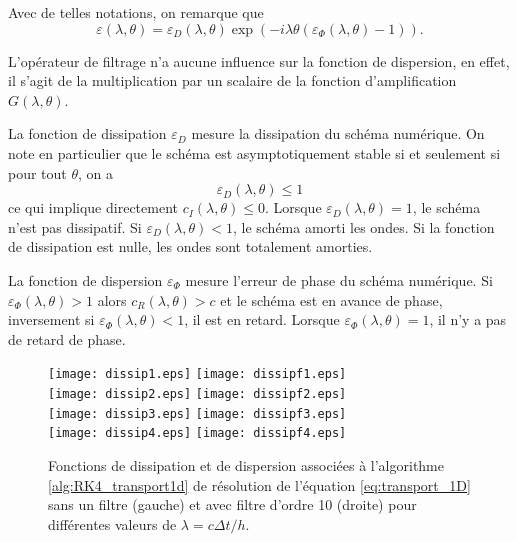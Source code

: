Avec de telles notations, on remarque que
\begin{equation}
\varepsilon(\lambda,\theta) = \varepsilon_D(\lambda,\theta) \exp \left( - i \lambda \theta \left( \varepsilon_{\Phi}(\lambda,\theta) -1 \right) \right).
\end{equation}

L'opérateur de filtrage n'a aucune influence sur la fonction de dispersion, en effet, il s'agit de la multiplication par un scalaire de la fonction d'amplification $G(\lambda,\theta)$.

La fonction de dissipation $\varepsilon_D$ mesure la dissipation du schéma numérique. On note en particulier que le schéma est asymptotiquement stable si et seulement si pour tout $\theta$, on a 
\begin{equation}
\varepsilon_D(\lambda,\theta) \leq 1
\end{equation}
ce qui implique directement $c_I(\lambda,\theta) \leq 0$. Lorsque $\varepsilon_D(\lambda, \theta) = 1$, le schéma n'est pas dissipatif. Si $\varepsilon_D(\lambda,\theta) < 1$, le schéma amorti les ondes. Si la fonction de dissipation est nulle, les ondes sont totalement amorties.

La fonction de dispersion $\varepsilon_{\Phi}$ mesure l'erreur de phase du schéma numérique. Si $\varepsilon_{\Phi}(\lambda, \theta) > 1$ alors $c_R(\lambda,\theta) > c$ et le schéma est en avance de phase, inversement si $\varepsilon_{\Phi}(\lambda, \theta) < 1$, il est en retard. Lorsque $\varepsilon_{\Phi}(\lambda, \theta) = 1$, il n'y a pas de retard de phase.

\begin{figure}[htbp]
\begin{center}
\texttt{[image: dissip1.eps]}
\texttt{[image: dissipf1.eps]}\\
\texttt{[image: dissip2.eps]}
\texttt{[image: dissipf2.eps]}\\
\texttt{[image: dissip3.eps]}
\texttt{[image: dissipf3.eps]}\\
\texttt{[image: dissip4.eps]}
\texttt{[image: dissipf4.eps]}
\end{center}
\caption{Fonctions de dissipation et de dispersion associées à l'algorithme \ref{alg:RK4_transport1d} de résolution de l'équation \eqref{eq:transport_1D} sans un filtre (gauche) et avec filtre d'ordre 10 (droite) pour différentes valeurs de $\lambda = c \Delta t / h$.}
\label{fig:dissip_disper}
\end{figure}

